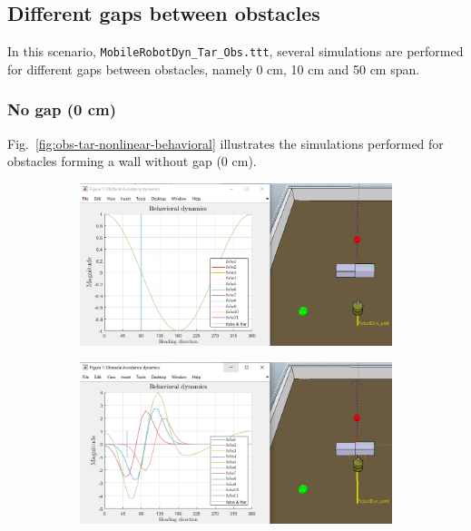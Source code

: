 \subsection{Different gaps between obstacles}
In this scenario, \texttt{MobileRobotDyn\_Tar\_Obs.ttt},
several simulations are performed for different gaps between obstacles, namely 0
cm, 10 cm and 50 cm span.

\subsubsection{No gap (0 cm)}%
\label{sec:Different-gaps-0cm}
Fig.~\ref{fig:obs-tar-nonlinear-behavioral} illustrates the simulations
performed for obstacles forming a wall without gap (0 cm).
%
\begin{figure}[htb!]
  \centering
  \begin{subfigure}{.45\textwidth}
  \includegraphics[width=\textwidth]{img/3-2-1.PNG}%
  \caption{}%
  \label{fig:obs-tar-nonlinear-behavioral-1}
  \end{subfigure}
  \begin{subfigure}{.45\textwidth}
    \includegraphics[width=\textwidth]{img/3-2-2.PNG}%
  \caption{}%
  \label{fig:obs-tar-nonlinear-behavioral-2}

\end{subfigure}
\end{figure}
